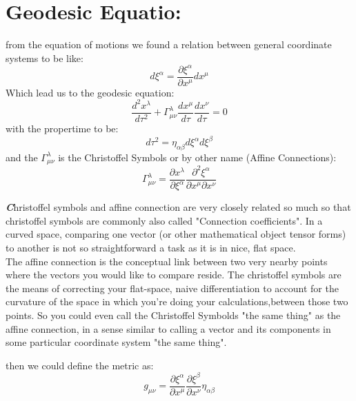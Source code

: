 \documentclass[10pt,a4paper]{article}
\newcounter{def}
\newenvironment{callout}
	{\begin{calloutbox}\color{charcoal}\textbf\textit}
	{\end{calloutbox}}
\begin{document}
     \section{Geodesic Equatio:}
     from the equation of motions we found a relation between general coordinate systems to be like:
     \begin{equation}
          d\xi^\alpha = \frac{\partial \xi^\alpha}{\partial x^\mu}dx^\mu
     \end{equation}
     Which lead us to the geodesic equation:
     \begin{equation}
          \frac{d^2x^\lambda}{d\tau^2} + \Gamma^\lambda_{\mu\nu} \frac{dx^\mu}{d\tau}\frac{dx^\nu}{d\tau} = 0
     \end{equation}
     with the propertime to be:
     \begin{equation}
          d\tau^2 = \eta_{\alpha\beta}d\xi^\alpha d\xi^\beta
     \end{equation}
     and the $\Gamma^\lambda_{\mu\nu}$ is the Christoffel Symbols or by other name (Affine Connections): 
     \begin{equation}
          \Gamma^\lambda_{\mu\nu} = \frac{\partial x^\lambda}{\partial \xi^\alpha} \frac{\partial^2 \xi^\alpha }{\partial x^\mu \partial x^\nu}
     \end{equation}
     \begin{callout}
          Christoffel symbols and affine connection are very closely related so much so that christoffel symbols are commonly also called "Connection coefficients". In a curved space, comparing one vector (or other mathematical object tensor forms) to another is not so straightforward a task as it is in nice, flat space. 
          \\
          The affine connection is the conceptual link between two very nearby points where the vectors you would like to compare reside. The christoffel symbols are the means of correcting your flat-space, naive differentiation to account for the curvature of the space in which you're doing your calculations,between those two points. So you could even call the Christoffel Symbolds "the same thing" as the affine connection, in a sense similar to calling a vector and its components in some particular coordinate system "the same thing".
     \end{callout}
     then we could define the metric as:
     \begin{equation}
          g_{\mu\nu}= \frac{\partial \xi^\alpha}{\partial x^\mu}\frac{\partial \xi^\beta}{\partial x^\nu} \eta_{\alpha\beta}
     \end{equation}
     
\end{document}
